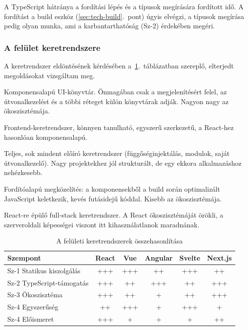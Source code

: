A TypeScript hátránya a fordítási lépés és a típusok megírására
fordított idő. A fordítást a build eszköz (\ref{sec:tech-build}.~pont)
úgyis elvégzi, a típusok megírása pedig olyan munka, ami a
karbantarthatóság (Sz-2) érdekében megéri.

\subsubsection{A felület keretrendszere}

A keretrendszer eldöntésének kérdésében a~\ref{tab:fe-matrix}.~táblázatban szereplő, elterjedt
megoldásokat vizsgáltam meg.

\begin{compactdesc}
    \item[React] Komponensalapú UI-könyvtár. Önmagában csak a
          megjelenítésért felel, az útvonalkezelést és a többi réteget
          külön könyvtárak adják. Nagyon nagy az ökoszisztémája.
    \item[Vue] Frontend-keretrendszer, könnyen tanulható, egyszerű
          szerkezetű, a React-hez hasonlóan komponensalapú.
    \item[Angular] Teljes, sok mindent előíró keretrendszer
          (függőséginjektálás, modulok, saját útvonalkezelő). Nagy
          projektekhez jól strukturált, de egy ekkora alkalmazáshoz
          nehézkesebb.
    \item[Svelte] Fordítóalapú megközelítés: a komponensekből a build
          során optimalizált JavaScript keletkezik, kevés futásidejű
          kóddal. Kisebb az ökoszisztémája.
    \item[Next.js] React-re épülő full-stack keretrendszer. A React
          ökoszisztémáját örökli, a szerveroldali képességei viszont itt
          kihasználatlanok maradnának.
\end{compactdesc}

\begin{table}[H]
    \centering
    \begin{tabularx}{\textwidth}{|X|c|c|c|c|c|}
        \hline
        \textbf{Szempont} & \textbf{React} & \textbf{Vue} & \textbf{Angular} & \textbf{Svelte} & \textbf{Next.js} \\ \hline
        Sz-1 Statikus kiszolgálás  & +++ & +++ & ++  & +++ & ++  \\ \hline
        Sz-2 TypeScript-támogatás  & +++ & ++  & +++ & ++  & +++ \\ \hline
        Sz-3 Ökoszisztéma          & +++ & ++  & +   & ++  & +++ \\ \hline
        Sz-4 Egyszerűség           & ++  & +++ & +   & +++ & +   \\ \hline
        Sz-4 Előismeret            & +++ & +   & +   & +   & ++  \\ \hline
    \end{tabularx}
    \caption{A felületi keretrendszerek összehasonlítása}
    \label{tab:fe-matrix}
\end{table}

